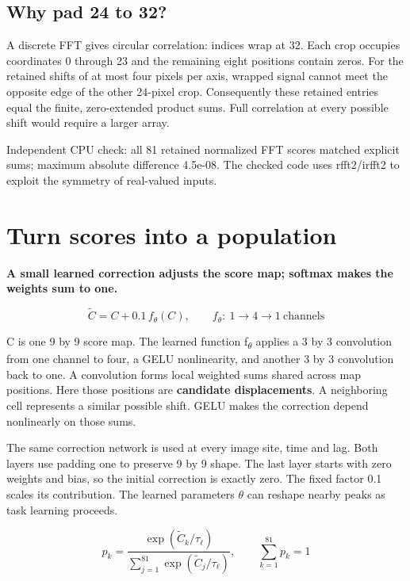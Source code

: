\documentclass[11pt,letterpaper]{article}
\begin{document}
\subsection*{Why pad 24 to 32?}

A discrete FFT gives circular correlation: indices wrap at 32. Each crop occupies coordinates 0 through 23 and the remaining eight positions contain zeros. For the retained shifts of at most four pixels per axis, wrapped signal cannot meet the opposite edge of the other 24-pixel crop. Consequently these retained entries equal the finite, zero-extended product sums. Full correlation at every possible shift would require a larger array.


{
\small\color{muted} Independent CPU check: all 81 retained normalized FFT scores matched explicit sums; maximum absolute difference 4.5e-08. The checked code uses rfft2/\allowbreak{}irfft2 to exploit the symmetry of real-valued inputs.\par}


\clearpage

\section{Turn scores into a population}\label{sec7}

\textbf{A small learned correction adjusts the score map; softmax makes the weights sum to one.}


\begin{equation}\widetilde C=C+0.1\,f_\theta(C),\qquad f_\theta:\ 1\to4\to1\ \mathrm{channels}\end{equation}

C is one 9 by 9 score map. The learned function f\textsubscript{\(\theta\)} applies a 3 by 3 convolution from one channel to four, a GELU nonlinearity, and another 3 by 3 convolution back to one. A convolution forms local weighted sums shared across map positions. Here those positions are \textbf{candidate displacements}. A neighboring cell represents a similar possible shift. GELU makes the correction depend nonlinearly on those sums.


The same correction network is used at every image site, time and lag. Both layers use padding one to preserve 9 by 9 shape. The last layer starts with zero weights and bias, so the initial correction is exactly zero. The fixed factor 0.1 scales its contribution. The learned parameters \(\theta\) can reshape nearby peaks as task learning proceeds.


\begin{equation}p_k=\frac{\exp(\widetilde C_k/\tau_\ell)}{\sum_{j=1}^{81}\exp(\widetilde C_j/\tau_\ell)},\qquad \sum_{k=1}^{81}p_k=1\end{equation}
\end{document}
